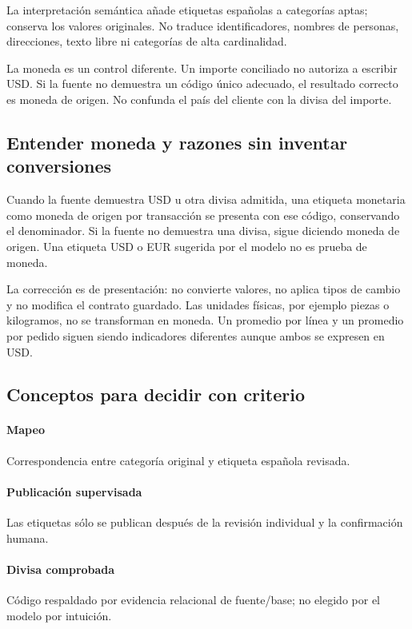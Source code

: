 La interpretación semántica añade etiquetas españolas a categorías aptas; conserva los valores originales. No traduce identificadores, nombres de personas, direcciones, texto libre ni categorías de alta cardinalidad.

La moneda es un control diferente. Un importe conciliado no autoriza a escribir USD. Si la fuente no demuestra un código único adecuado, el resultado correcto es moneda de origen. No confunda el país del cliente con la divisa del importe.

\subsection{Entender moneda y razones sin inventar conversiones}
Cuando la fuente demuestra USD u otra divisa admitida, una etiqueta monetaria como moneda de origen por transacción se presenta con ese código, conservando el denominador. Si la fuente no demuestra una divisa, sigue diciendo moneda de origen. Una etiqueta USD o EUR sugerida por el modelo no es prueba de moneda.

La corrección es de presentación: no convierte valores, no aplica tipos de cambio y no modifica el contrato guardado. Las unidades físicas, por ejemplo piezas o kilogramos, no se transforman en moneda. Un promedio por línea y un promedio por pedido siguen siendo indicadores diferentes aunque ambos se expresen en USD.

\subsection{Conceptos para decidir con criterio}
\paragraph{Mapeo} Correspondencia entre categoría original y etiqueta española revisada.

\paragraph{Publicación supervisada} Las etiquetas sólo se publican después de la revisión individual y la confirmación humana.

\paragraph{Divisa comprobada} Código respaldado por evidencia relacional de fuente/base; no elegido por el modelo por intuición.

